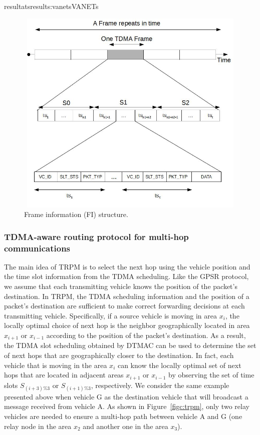 \documentclass{ra2016}
\begin{document}
\begin{module}{resultats}{results:vanets}{VANETs}
\begin{figure}[!h]
  \begin{center}
  \includegraphics[height=10cm,width=13cm]{IMG/DTMACFrame.jpg}
  \end{center}
  \caption{Frame information (FI) structure.}
 \label{figc:DTMAC_Frame}
\end{figure}

\subsubsection{TDMA-aware routing protocol for multi-hop communications}
 
The main idea of TRPM is to select the next hop using the vehicle position and the time 
slot information from the TDMA scheduling.  Like the GPSR protocol, we assume that each transmitting vehicle 
knows the position of the packet's destination. In TRPM, the TDMA scheduling information and the position of a packet's destination 
are sufficient to make correct forwarding decisions at each transmitting vehicle. Specifically, if a  source vehicle is moving in 
area $x_i$, the locally optimal choice of next hop is the neighbor geographically located in area $x_{i+1}$ or $x_{i-1}$ according 
to the position of the packet's destination. As a result, the TDMA slot scheduling obtained by DTMAC  can be used to determine the 
set of next hops that are geographically closer to the destination. In fact, each vehicle that is moving in the area $x_i$ can 
know the locally optimal set of next hops that are located in adjacent areas $x_{i+1}$ or $x_{i-1}$ by observing the set of time 
slots $S_{(i+3)\%3}$ or $S_{(i+1)\%3}$, respectively. We consider the same example presented above when vehicle G as the destination 
vehicle that will broadcast a message received from vehicle A. As shown in Figure~\ref{figc:trpm}, only two relay vehicles are needed to ensure a 
multi-hop path between vehicle A and G (one relay node in the area $x_2$ and another one in the area $x_3$). 



\end{module}
\end{document}
